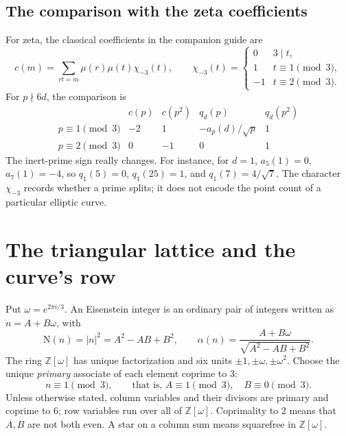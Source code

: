 \documentclass[11pt]{article}
\numberwithin{equation}{section}
\newcommand{\OO}{\mathbb Z[\omega]}
\newcommand{\N}{\mathrm N}
\begin{document}
\subsection{The comparison with the zeta coefficients}
For zeta, the classical coefficients in the companion guide are
\begin{equation}\label{eq:d005}
 c(m)=\sum_{rt=m}\mu(r)\mu(t)\chi_{-3}(t),\qquad
 \chi_{-3}(t)=
 \begin{cases}0&3\mid t,\\1&t\equiv1\pmod3,\\-1&t\equiv2\pmod3.
 \end{cases}
\end{equation}
For $p\nmid6d$, the comparison is
\begin{equation}\label{eq:d006}
\begin{array}{c|cc|cc}
 &c(p)&c(p^2)&q_d(p)&q_d(p^2)\\\hline
 p\equiv1\pmod3&-2&1&-a_p(d)/\sqrt p&1\\
 p\equiv2\pmod3&0&-1&0&1
\end{array}
\end{equation}
The inert-prime sign really changes. For instance, for $d=1$,
$a_5(1)=0$, $a_7(1)=-4$, so
$q_1(5)=0$, $q_1(25)=1$, and $q_1(7)=4/\sqrt7$.
The character $\chi_{-3}$ records whether a prime splits; it does not
encode the point count of a particular elliptic curve.

\section{The triangular lattice and the curve's row}\label{sec:lattice}

Put $\omega=e^{2\pi i/3}$. An Eisenstein integer is an ordinary pair of
integers written as $n=A+B\omega$, with
\begin{equation}\label{eq:d007}
 \N(n)=|n|^2=A^2-AB+B^2,\qquad
 \alpha(n)=\frac{A+B\omega}{\sqrt{A^2-AB+B^2}}.
\end{equation}
The ring $\OO$ has unique factorization and six units
$\pm1,\pm\omega,\pm\omega^2$. Choose the unique \emph{primary} associate
of each element coprime to $3$:
\begin{equation}\label{eq:d008}
 n\equiv1\pmod3,\qquad\text{that is, }A\equiv1\pmod3,
 \quad B\equiv0\pmod3.
\end{equation}
Unless otherwise stated, column variables and their divisors are primary
and coprime to $6$; row variables run over all of $\OO$. Coprimality to
$2$ means that $A,B$ are not both even. A star on a column sum means
squarefree in $\OO$.
\end{document}
